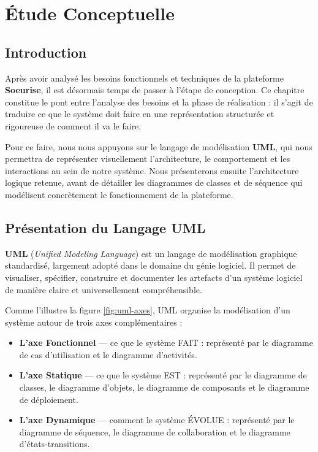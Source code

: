 \documentclass[12pt,a4paper]{report}
\begin{document}
	\chapter{Étude Conceptuelle}
	
	
	
	\localtableofcontents
	\newpage
	
	\section{Introduction}
	
	Après avoir analysé les besoins fonctionnels et techniques de la plateforme 
	\textbf{Soeurise}, il est désormais temps de passer à l'étape de conception. 
	Ce chapitre constitue le pont entre l'analyse des besoins et la phase de 
	réalisation : il s'agit de traduire ce que le système doit faire en une 
	représentation structurée et rigoureuse de comment il va le faire.
	
	Pour ce faire, nous nous appuyons sur le langage de modélisation \textbf{UML}, 
	qui nous permettra de représenter visuellement l'architecture, le comportement 
	et les interactions au sein de notre système. Nous présenterons ensuite 
	l'architecture logique retenue, avant de détailler les diagrammes de classes 
	et de séquence qui modélisent concrètement le fonctionnement de la plateforme.
	
	\section{Présentation du Langage UML}
	
	\textbf{UML} (\textit{Unified Modeling Language}) est un langage de modélisation 
	graphique standardisé, largement adopté dans le domaine du génie logiciel. 
	Il permet de visualiser, spécifier, construire et documenter les artefacts 
	d'un système logiciel de manière claire et universellement compréhensible.
	
	Comme l'illustre la figure \ref{fig:uml-axes}, UML organise la modélisation 
	d'un système autour de trois axes complémentaires :
	
	\begin{itemize}
		\item \textbf{L'axe Fonctionnel} — ce que le système FAIT : représenté 
		par le diagramme de cas d'utilisation et le diagramme d'activités.
		
		\item \textbf{L'axe Statique} — ce que le système EST : représenté 
		par le diagramme de classes, le diagramme d'objets, le diagramme 
		de composants et le diagramme de déploiement.
		
		\item \textbf{L'axe Dynamique} — comment le système ÉVOLUE : représenté 
		par le diagramme de séquence, le diagramme de collaboration et le 
		diagramme d'états-transitions.
	\end{itemize}
	
\end{document}
